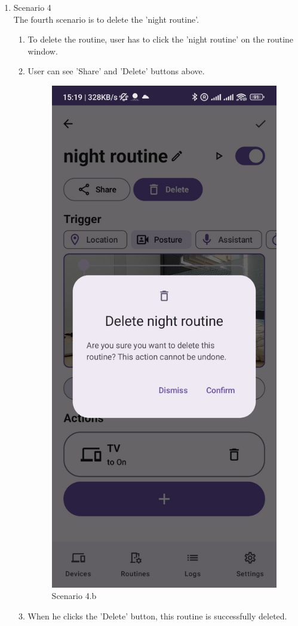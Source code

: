 \begin{enumerate}
    \item Scenario 4\\
    The fourth scenario is to delete the 'night routine'.\\
    \begin{enumerate}
        \item To delete the routine, user has to click the 'night routine' on the routine window.\\
        \item User can see 'Share' and 'Delete' buttons above.\\
        \begin{figure}
            \centering
            \includegraphics[width=0.5\linewidth]{imgs//usercase/scenario4-b.jpg}
            \caption{Scenario 4.b}
            \label{fig:enter-label}
        \end{figure}
        \item When he clicks the 'Delete' button, this routine is successfully deleted.\\
        \begin{figure}
            \centering

\end{figure}
\end{enumerate}
\end{enumerate}

